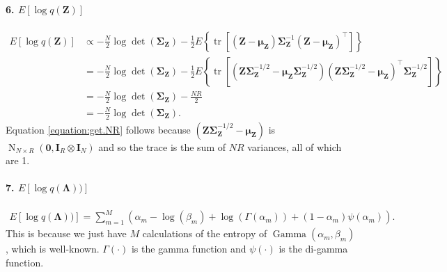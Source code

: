 \documentclass[11pt,authoryear]{article}
\DeclareMathOperator*{\tr}{tr}
\DeclareMathOperator*{\N}{N}
\DeclareMathOperator*{\gm}{Gamma}
\newcommand{\bs}[1]{\boldsymbol{#1}}
\begin{document}
\paragraph{6. $E[\log q(\bs{Z})]$}
\begin{align}
E[\log q(\bs{Z})] &\propto -\frac{N}{2}\log\det(\bs{\Sigma}_{\bs{Z}}) - \frac{1}{2}E\left\{\tr\left[(\bs{Z} - \bs{\mu}_{\bs{Z}})\bs{\Sigma}_{\bs{Z}}^{-1}(\bs{Z} - \bs{\mu}_{\bs{Z}})^{\intercal}\right]\right\}\\
&= -\frac{N}{2}\log\det(\bs{\Sigma}_{\bs{Z}}) - \frac{1}{2}E\left\{\tr\left[(\bs{Z}\bs{\Sigma}_{\bs{Z}}^{-1/2} - \bs{\mu}_{\bs{Z}}\bs{\Sigma}_{\bs{Z}}^{-1/2})(\bs{Z}\bs{\Sigma}_{\bs{Z}}^{-1/2} - \bs{\mu}_{\bs{Z}})^{\intercal}\bs{\Sigma}_{\bs{Z}}^{-1/2}\right]\right\}\\
\label{equation:get.NR}&= -\frac{N}{2}\log\det(\bs{\Sigma}_{\bs{Z}}) - \frac{NR}{2}\\
&= -\frac{N}{2}\log\det(\bs{\Sigma}_{\bs{Z}}).
\end{align}
Equation \eqref{equation:get.NR} follows because
$(\bs{Z}\bs{\Sigma}_{\bs{Z}}^{-1/2} - \bs{\mu}_{\bs{Z}})$ is
$\N_{N\times R}(\bs{0}, \bs{I}_R \otimes \bs{I}_N)$ and so the trace is
the sum of $NR$ variances, all of which are 1.

\paragraph{7. $E[\log q(\bs{\Lambda}))]$}
\begin{align}
E[\log q(\bs{\Lambda}))] = \sum_{m = 1}^M \left( \alpha_m - \log(\beta_m) + \log(\Gamma(\alpha_m)) + (1 - \alpha_m)\psi(\alpha_m)\right).
\end{align}
This is because we just have $M$ calculations of the entropy of
$\gm(\alpha_m,\beta_m)$, which is well-known. $\Gamma(\cdot)$ is the
gamma function and $\psi(\cdot)$ is the di-gamma function.
\end{document}
